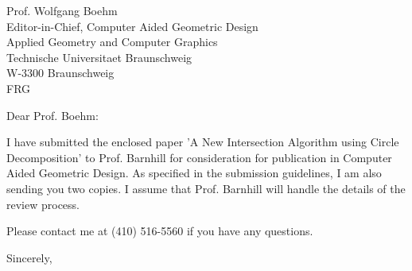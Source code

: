 \signature{Prof. John K. Johnstone\\jj@cs.jhu.edu}

\begin{letter}
{Prof. Wolfgang Boehm\\
Editor-in-Chief, Computer Aided Geometric Design\\
Applied Geometry and Computer Graphics\\
Technische Universitaet Braunschweig\\
W-3300 Braunschweig\\
FRG
}

\opening{Dear Prof. Boehm:}

I have submitted the enclosed paper 'A New Intersection Algorithm
using Circle Decomposition' to Prof. Barnhill for consideration for
publication in Computer Aided Geometric Design.
As specified in the submission guidelines, I am also sending you two copies.
I assume that Prof. Barnhill will handle the details of the review process.

Please contact me at (410) 516-5560 if you have any questions.

\closing{Sincerely,}
\end{letter}


